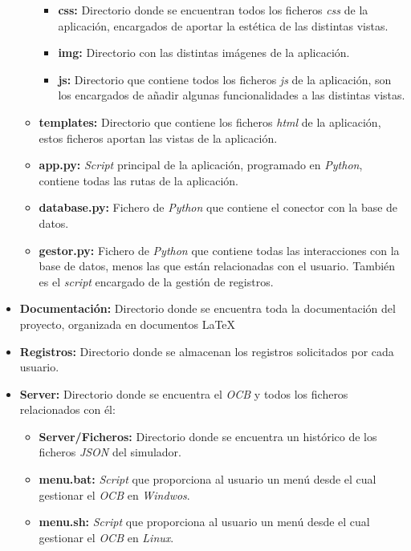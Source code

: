 \begin{itemize}
\begin{itemize}
        \begin{itemize}
            \item \textbf{css:} Directorio donde se encuentran todos los ficheros \textit{css} de la aplicación, encargados de aportar la estética de las distintas vistas.
            \item \textbf{img:} Directorio con las distintas imágenes de la aplicación.
            \item \textbf{js:} Directorio que contiene todos los ficheros \textit{js} de la aplicación, son los encargados de añadir algunas funcionalidades a las distintas vistas.
        \end{itemize}
        \item \textbf{templates:} Directorio que contiene los ficheros \textit{html} de la aplicación, estos ficheros aportan las vistas de la aplicación.
        \item \textbf{app.py:} \textit{Script} principal de la aplicación, programado en \textit{Python}, contiene todas las rutas de la aplicación.
        \item \textbf{database.py:} Fichero de \textit{Python} que contiene el conector con la base de datos.
        \item \textbf{gestor.py:} Fichero de \textit{Python} que contiene todas las interacciones con la base de datos, menos las que están relacionadas con el usuario. También es el \textit{script} encargado de la gestión de registros.
    \end{itemize}
    \item \textbf{Documentación:} Directorio donde se encuentra toda la documentación del proyecto, organizada en documentos \LaTeX{}
    \item \textbf{Registros:} Directorio donde se almacenan los registros solicitados por cada usuario.
    \item \textbf{Server:} Directorio donde se encuentra el \textit{OCB} y todos los ficheros relacionados con él:
    \begin{itemize}
        \item \textbf{Server/Ficheros:} Directorio donde se encuentra un histórico de los ficheros \textit{JSON} del simulador.
        \item \textbf{menu.bat:} \textit{Script} que proporciona al usuario un menú desde el cual gestionar el \textit{OCB} en \textit{Windwos}.
        \item \textbf{menu.sh:} \textit{Script} que proporciona al usuario un menú desde el cual gestionar el \textit{OCB} en \textit{Linux}.

\end{itemize}
\end{itemize}
